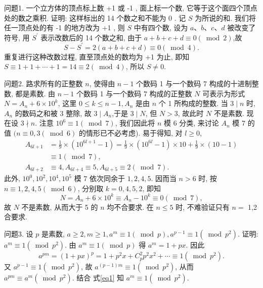 
问题1. 一个立方体的顶点标上数 +1 或 -1 , 面上标一个数, 它等于这个面四个顶点处的数之乘积.
证明: 这样标出的 14 个数之和不能为 0 .
记 $S$ 为所说的和.
我们将任一顶点处的有 -1 的地方改为 +1 , 则 $S$ 中有四个数, 设为 $a 、 b 、 c 、 d$ 被改变了符号, 用 $S^{\prime}$ 表示改数后的 14 个数之和, 由于 $a+b+c+d \equiv 0(\bmod 2)$,故
$$
S-S^{\prime}=2(a+b+c+d) \equiv 0(\bmod 4) .
$$
重复进行这种改数过程, 直至顶点处的数均为 +1 为止, 即知 $S \equiv 1+1+\cdots+ 1=14 \equiv 2(\bmod 4)$, 所以 $S \neq 0$.



问题2. 路求所有的正整数 $n$, 使得由 $n-1$ 个数码 1 与一个数码 7 构成的十进制整数, 都是素数.
由 $n-1$ 个数码 1 与一个数码 7 构成的正整数 $N$ 可表示为形式 $N= A_n+6 \times 10^k$, 这里 $0 \leqslant k \leqslant n-1, A_n$ 是由 $n$ 个 1 所构成的整数.
当 $3 \mid n$ 时, $A_n$ 的数码之和被 3 整除, 故 $3 \mid A_n$,于是 $3 \mid N$, 但 $N>3$, 故此时 $N$ 不是素数.
现在设 $3 \nmid n$. 注意 $10^6 \equiv 1(\bmod 7)$, 我们因此将 $n$ 模 6 分类, 来讨论 $A_n$ 模 7 的值 $(n \equiv 0,3(\bmod 6)$ 的情形已不必考虑). 易于得知, 对 $l \geqslant 0$,
$$
\begin{aligned}
A_{6 l+1} & =\frac{1}{9} \times\left(10^{6 l+1}-1\right)=\frac{1}{9} \times\left(10^{6 l}-1\right) \times 10+\frac{1}{9} \times(10-1) \\
& \equiv 1(\bmod 7), \\
A_{6 l+2} & \equiv 4, A_{6 l+4} \equiv 5, A_{6 l+5} \equiv 2(\bmod 7) .
\end{aligned}
$$
此外, $10^0, 10^2, 10^4, 10^5$ 模 7 依次同余于 $1,2,4,5$. 因而当 $n>6$ 时, 按 $n \equiv 1,2,4,5(\bmod 6)$, 分别取 $k=0,4,5,2$, 即知
$$
N=A_n+6 \times 10^k \equiv A_n-10^k \equiv 0(\bmod 7),
$$
故 $N$ 不是素数, 从而大于 5 的 $n$ 均不合要求.
在 $n \leqslant 5$ 时, 不难验证只有 $n=$ 1,2 合要求.



问题3. 设 $p$ 是素数, $a \geqslant 2, m \geqslant 1, a^m \equiv 1(\bmod p), a^{p-1} \equiv 1\left(\bmod p^2\right)$. 证明: $a^m \equiv 1\left(\bmod p^2\right)$.
由 $a^m \equiv 1(\bmod p)$ 得 $a^m=1+p x$. 因此
$$
a^{p m}=(1+p x)^p=1+p^2 x+C_p^2 p^2 x^2+\cdots \equiv 1\left(\bmod p^2\right) . \label{eq1}
$$
又 $a^{p-1} \equiv 1\left(\bmod p^2\right)$, 故 $a^{(p-1) m} \equiv 1\left(\bmod p^2\right)$, 从而 $a^{p m} \equiv a^m\left(\bmod p^2\right)$. 结合 式\ref{eq1} 知 $a^m \equiv 1\left(\bmod p^2\right)$.



